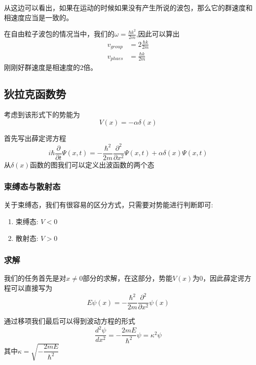 \documentclass{article}
\begin{document}
从这边可以看出，如果在运动的时候如果没有产生所说的波包，那么它的群速度和相速度应当是一致的。

在自由粒子波包的情况当中，我们的$\omega = \frac{\hbar k^2}{2m}$,因此可以算出
\begin{align*}
	v_{group} & =2\frac{\hbar k}{2m} \\
	v_{phaes} & =\frac{\hbar k}{2m}
\end{align*}
刚刚好群速度是相速度的$2$倍。

\subsection{狄拉克函数势}

考虑到该形式下的势能为
\[V(x)=-\alpha\delta(x)\]

\begin{figure}[hbtp]
	\centering
\end{figure}

首先写出薛定谔方程
\[
	i\hbar\frac{\partial}{\partial t}\Psi(x,t)=-\frac{\hbar^2}{2m}\frac{\partial^2}{\partial x^2}\Psi(x,t)+\alpha\delta(x)\Psi(x,t)
\]
从$\delta(x)$函数的图我们可以定义出波函数的两个态
\subsubsection{束缚态与散射态}
关于束缚态，我们有很容易的区分方式，只需要对势能进行判断即可:

\begin{enumerate}
	\item[$\cdot$] 束缚态: $V < 0$
	\item[$\cdot$] 散射态: $V > 0$
\end{enumerate}


\subsubsection{求解}

我们的任务首先是对$x\neq 0$部分的求解，在这部分，势能$V(x)$为$0$，因此薛定谔方程可以直接写为
\[
	E\psi(x)=-\frac{\hbar^2}{2m}\frac{\partial^2}{\partial x^2}\psi(x)
\]

通过移项我们最后可以得到波动方程的形式
\[
	\frac{d^2\psi}{dx^2}=-\frac{2mE}{\hbar^2}\psi=\kappa^2\psi
\]
其中$\displaystyle\kappa=\sqrt{-\dfrac{2mE}{\hbar^2}}$
\end{document}
